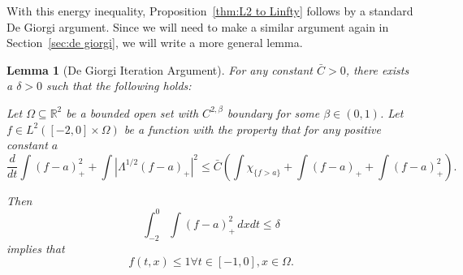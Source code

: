 \documentclass[11pt]{amsart}
\newtheorem{lemma}[theorem]{Lemma}
\theoremstyle{remark}
\theoremstyle{definition}
\newcommand{\R}{\mathbb{R}}
\newcommand{\paren}[1]{\left( #1 \right)}
\newcommand{\abs}[1]{\left\lvert #1 \right\rvert}
\newcommand{\ddt}{\frac{d}{dt}}
\newcommand{\indic}[1]{\chi_{\{#1\}}}
\begin{document}
With this energy inequality, Proposition~\ref{thm:L2 to Linfty} follows by a standard De Giorgi argument.  Since we will need to make a similar argument again in Section~\ref{sec:de giorgi}, we will write a more general lemma.  

\begin{lemma}[De Giorgi Iteration Argument] \label{thm:DG1 skeleton}
For any constant $\bar{C} > 0$, there exists a $\delta>0$ such that the following holds:

Let $\Omega \subseteq \R^2$ be a bounded open set with $C^{2,\beta}$ boundary for some $\beta \in (0,1)$.  
Let $f \in L^2([-2,0]\times\Omega)$ be a function with the property that for any positive constant $a$
\begin{equation} \label{DG energy ddt} \ddt \int (f-a)_+^2 + \int \abs{\Lambda^{1/2} (f-a)_+}^2 \leq \bar{C} \paren{ \int \indic{f > a} + \int (f-a)_+ + \int (f-a)_+^2 }. \end{equation}

Then
\[ \int_{-2}^0 \int (f-a)_+^2 \,dxdt \leq \delta \]
implies that
\[ f(t,x) \leq 1 \forall t\in[-1,0], x \in \Omega. \]
\end{lemma}
\end{document}
